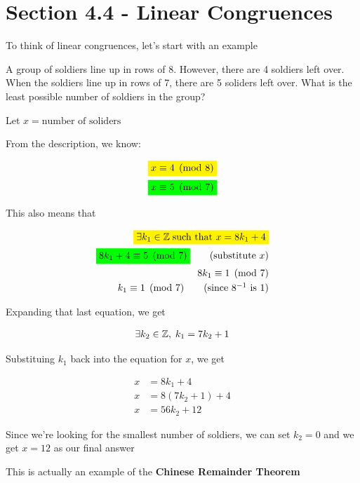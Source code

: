 \documentclass[../../Main.tex]{subfiles}
\begin{document}
\section{Section 4.4 - Linear Congruences}

To think of linear congruences, let's start with an example

\begin{example}
    A group of soldiers line up in rows of 8. However, there are 4 soldiers left over.
    When the soldiers line up in rows of 7, there are 5 soliders left over.
    What is the least possible number of soldiers in the group?

    Let $x= \text{number of soliders}$

    From the description, we know:

    \begin{align*}
        \yellowbox{$x \equiv 4 \pmod{8}$} \\
        \greenbox{$x \equiv 5 \pmod {7}$} \\
    \end{align*}

    This also means that

    \begin{align*}
        \yellowbox{$\exists k_1 \in \setZ \; \text{such that } x = 8k_1 + 4$} \\
        \greenbox{$8k_1 + 4 \equiv 5 \pmod{7}$} \tag{substitute $x$}\\
        8k_1 \equiv 1 \pmod{7} \\
        k_1 \equiv 1 \pmod{7} \tag{since $8^{-1}$ is 1}
    \end{align*}

    Expanding that last equation, we get

    \begin{align*}
        \exists k_2 \in \mathbb{Z}, \; k_1 = 7k_2 + 1
    \end{align*}

    Substituing $k_1$ back into the equation for $x$, we get

    \begin{align*}
        x &= 8k_1 + 4 \tag{original} \\
        x &= 8(7k_2 + 1) + 4 \tag{substitute} \\
        x &= 56k_2 + 12
    \end{align*}

    Since we're looking for the smallest number of soldiers, we can set $k_2 = 0$ and
    we get $\boxed{x = 12}$ as our final answer

    This is actually an example of the \textbf{Chinese Remainder Theorem}
\end{example}
\end{document}
